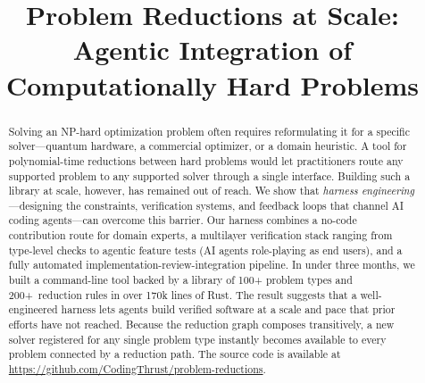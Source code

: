 \documentclass[conference]{IEEEtran}
\begin{document}
\title{Problem Reductions at Scale: Agentic Integration of Computationally Hard Problems}

\author{
}

\maketitle

\begin{abstract}
Solving an NP-hard optimization problem often requires reformulating it for a specific solver---quantum hardware, a commercial optimizer, or a domain heuristic.
A tool for polynomial-time reductions between hard problems would let practitioners route any supported problem to any supported solver through a single interface.
Building such a library at scale, however, has remained out of reach.
We show that \emph{harness engineering}---designing the constraints, verification systems, and feedback loops that channel AI coding agents---can overcome this barrier.
Our harness combines a no-code contribution route for domain experts, a multilayer verification stack ranging from type-level checks to agentic feature tests (AI agents role-playing as end users), and a fully automated implementation-review-integration pipeline.
In under three months, we built a command-line tool backed by a library of 100+ problem types and 200+~reduction rules in over 170k lines of Rust.
The result suggests that a well-engineered harness lets agents build verified software at a scale and pace that prior efforts have not reached.
Because the reduction graph composes transitively, a new solver registered for any single problem type instantly becomes available to every problem connected by a reduction path.
The source code is available at \url{https://github.com/CodingThrust/problem-reductions}.
\end{abstract}
\end{document}
